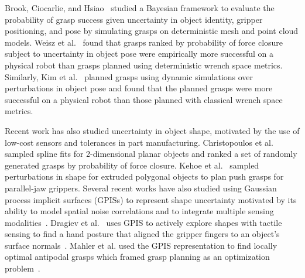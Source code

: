 \documentclass[10pt, conference]{ieeeconf}      %
\begin{document}
Brook, Ciocarlie, and Hsiao~\cite{brook2011collaborative, hsiao2011bayesian} studied a Bayesian framework to evaluate the probability of grasp success given uncertainty in object identity, gripper positioning, and pose by simulating grasps on deterministic mesh and point cloud models.
Weisz et al.~\cite{weisz2012pose} found that grasps ranked by probability of force closure subject to uncertainty in object pose were empirically more successful on a physical robot than grasps planned using deterministic wrench space metrics. 
Similarly, Kim et al.~\cite{kim2012physically} planned grasps using dynamic simulations over perturbations in object pose and found that the planned grasps were more successful on a physical robot than those planned with classical wrench space metrics.

Recent work has also studied uncertainty in object shape, motivated by the use of low-cost sensors and tolerances in part manufacturing.
Christopoulos et al.~\cite{christopoulos2007handling} sampled spline fits for 2-dimensional planar objects and ranked a set of randomly generated grasps by probability of force closure.
Kehoe et al.~\cite{kehoe2012estimating, kehoe2012toward} sampled perturbations in shape for extruded polygonal objects to plan push grasps for parallel-jaw grippers.
Several recent works have also studied using Gaussian process implicit surfaces (GPISs) to represent shape uncertainty motivated by its ability to model spatial noise correlations and to integrate multiple sensing modalities~\cite{dragiev2011, dragiev2013uncertainty, hollinger2013, mahler2015gp}.
Dragiev et al.~\cite{dragiev2011} uses GPIS to actively explore shapes with tactile sensing to find a hand posture that aligned the gripper fingers to an object's surface normals~\cite{dragiev2013uncertainty}.
Mahler et al. used the GPIS representation to find locally optimal antipodal grasps which framed grasp planning as an optimization problem~\cite{mahler2015gp}. 





\end{document}
